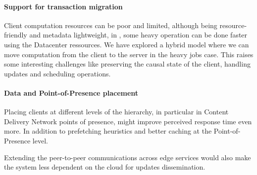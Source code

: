 \paragraph{Support for transaction migration}
Client computation resources can be poor and limited, although
being resource-friendly and metadata lightweight, in \system{}, some heavy operation can
be done faster using the Datacenter ressources. 
We have explored a hybrid model where we
can move computation from the client to the server in the heavy jobs case. This raises
some interesting challenges like preserving the causal state of the client, handling updates
and scheduling operations.

\paragraph{Data and Point-of-Presence placement}
Placing clients at different levels of the hierarchy, in particular in
Content Delivery Network points of presence, might improve perceived
response time even more.
In addition to prefetching heuristics and better caching at the 
Point-of-Presence level.

Extending the peer-to-peer communications across edge services would also make 
the system less dependent on the cloud for updates dissemination.

